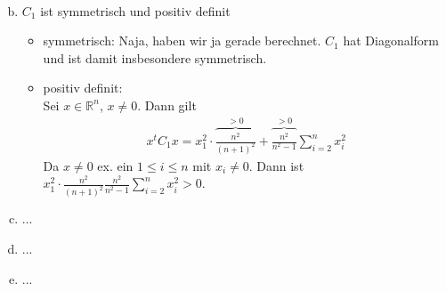 \documentclass[11pt,a4paper,ngerman]{article}
\begin{document}
\begin{enumerate}[(a)]
\begin{equation*}
\begin{split}
    \end{split}\end{equation*}
\item $C_1$ ist symmetrisch und positiv definit \\
      \begin{itemize}
        \item symmetrisch: Naja, haben wir ja gerade berechnet. $C_1$ hat Diagonalform und ist damit
              insbesondere symmetrisch.
        \item positiv definit: \\
              Sei $x \in \mathbb{R}^n$, $x \neq 0$. Dann gilt
              \begin{equation}\begin{split}
                x^t C_1 x = x_1^2 \cdot \overbrace{\frac{n^2}{(n+1)^2}}^{> 0}
                            + \overbrace{\frac{n^2}{n^2-1}}^{> 0} \sum_{i=2}^n  x_i^2
              \end{split}\end{equation}
              Da $x \neq 0$ ex. ein $1 \leq i \leq n$ mit $x_i \neq 0$. Dann ist
              $x_1^2 \cdot \frac{n^2}{(n+1)^2} \frac{n^2}{n^2-1} \sum_{i=2}^n  x_i^2 > 0$.
      \end{itemize}
\item ...
\item ...
\item ...
\end{enumerate}

\label{LastPage}
\end{document}
